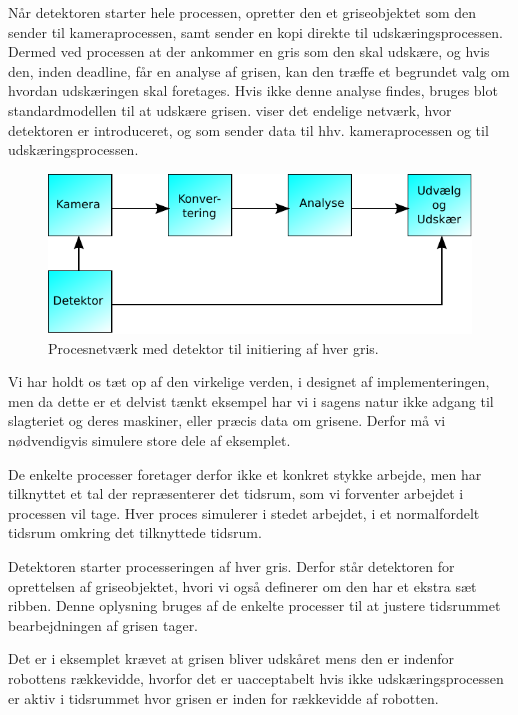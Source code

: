 Når detektoren starter hele processen, opretter den et griseobjektet som den sender til kameraprocessen, samt sender en kopi direkte til udskæringsprocessen. Dermed ved processen at der ankommer en gris som den skal udskære, og hvis den, inden deadline, får en analyse af grisen, kan den træffe et begrundet valg om hvordan udskæringen skal foretages. Hvis ikke denne analyse findes, bruges blot standardmodellen til at udskære grisen.  viser det endelige  netværk, hvor detektoren er introduceret, og som sender data til hhv. kameraprocessen og til udskæringsprocessen. 

\begin{figure}
 \begin{center}
  \includegraphics[scale=1]{images/pig-network2}
	\caption{Procesnetværk med detektor til initiering af hver gris.}
	\label{fig:pig-network2}
\end{center}
\end{figure}

Vi har holdt os tæt op af den virkelige verden, i designet af implementeringen, men da dette er et delvist tænkt eksempel har vi i  sagens natur ikke  adgang til slagteriet og deres maskiner, eller præcis data om grisene. Derfor må vi nødvendigvis simulere store dele af eksemplet. 

De enkelte processer foretager derfor ikke et konkret stykke arbejde, men har  tilknyttet et tal der repræsenterer det tidsrum, som vi forventer arbejdet i processen vil tage. Hver proces simulerer i stedet arbejdet, i et normalfordelt tidsrum omkring det tilknyttede tidsrum.

Detektoren starter processeringen af hver gris. Derfor står detektoren for oprettelsen af griseobjektet, hvori vi også  definerer om den har et ekstra sæt ribben. Denne oplysning bruges af de enkelte processer til at justere tidsrummet bearbejdningen af grisen tager. 

Det er i eksemplet  krævet at  grisen bliver udskåret mens den er indenfor robottens rækkevidde, hvorfor det er uacceptabelt hvis ikke udskæringsprocessen er aktiv i tidsrummet hvor grisen er inden for rækkevidde af robotten. 

